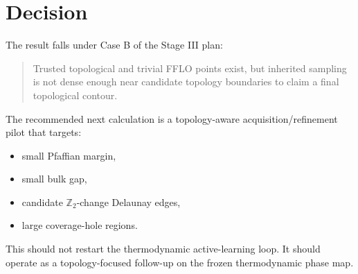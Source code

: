 \documentclass[11pt]{article}
\begin{document}
\section{Decision}

The result falls under Case B of the Stage III plan:

\begin{quote}
Trusted topological and trivial FFLO points exist, but inherited sampling is
not dense enough near candidate topology boundaries to claim a final
topological contour.
\end{quote}

The recommended next calculation is a topology-aware acquisition/refinement
pilot that targets:
\begin{itemize}
  \item small Pfaffian margin,
  \item small bulk gap,
  \item candidate $\mathbb{Z}_2$-change Delaunay edges,
  \item large coverage-hole regions.
\end{itemize}
This should not restart the thermodynamic active-learning loop.  It should
operate as a topology-focused follow-up on the frozen thermodynamic phase map.
\end{document}
